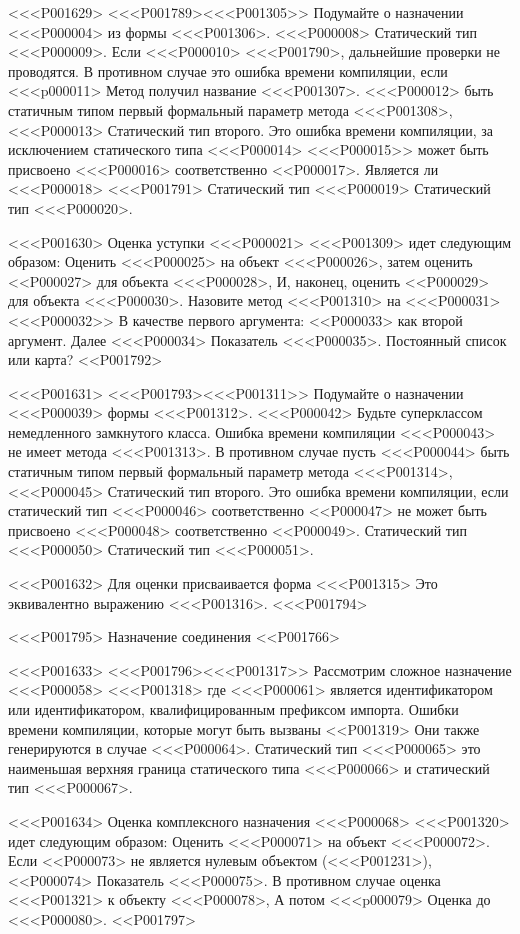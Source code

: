 <<<P001629>%
<<<P001789><<<P001305>>
Подумайте о назначении <<<P000004> из формы <<<P001306>.
<<<P000008> Статический тип <<<P000009>.
Если <<<P000010> <<<P001790>, дальнейшие проверки не проводятся.
В противном случае это ошибка времени компиляции, если
<<<p000011> Метод получил название <<<P001307>.
<<<P000012> быть статичным типом
первый формальный параметр метода <<<P001308>,
<<<P000013> Статический тип второго.
Это ошибка времени компиляции, за исключением статического типа <<<P000014> <<<P000015>>
может быть присвоено <<<P000016> соответственно <<P000017>.
Является ли <<<P000018> <<<P001791>
Статический тип <<<P000019> Статический тип <<<P000020>.

<<<P001630>%
Оценка уступки <<<P000021> <<<P001309>
идет следующим образом:
Оценить <<<P000025> на объект <<<P000026>,
затем оценить <<P000027> для объекта <<<P000028>,
И, наконец, оценить <<P000029> для объекта <<<P000030>.
Назовите метод <<<P001310> на <<<P000031>
<<<P000032>> В качестве первого аргумента: <<P000033> как второй аргумент.
Далее <<<P000034> Показатель <<<P000035>.
Постоянный список или карта?
<<P001792>

<<<P001631>%
<<<P001793><<<P001311>>
Подумайте о назначении <<<P000039> формы <<<P001312>.
<<<P000042> Будьте суперклассом немедленного замкнутого класса.
Ошибка времени компиляции <<<P000043> не имеет метода <<<P001313>.
В противном случае пусть <<<P000044> быть статичным типом
первый формальный параметр метода <<<P001314>,
<<<P000045> Статический тип второго.
Это ошибка времени компиляции, если статический тип <<<P000046> соответственно <<P000047>
не может быть присвоено <<<P000048> соответственно <<P000049>.
Статический тип <<<P000050> Статический тип <<<P000051>.

<<<P001632>%
Для оценки присваивается форма <<<P001315>
Это эквивалентно выражению <<<P001316>.
<<<P001794>


<<<P001795> Назначение соединения
<<P001766>

<<<P001633>%
<<<P001796><<<P001317>>
Рассмотрим сложное назначение <<<P000058> <<<P001318>
где <<<P000061> является идентификатором или идентификатором, квалифицированным префиксом импорта.
Ошибки времени компиляции, которые могут быть вызваны
<<P001319>
Они также генерируются в случае <<<P000064>.
Статический тип <<<P000065> это
наименьшая верхняя граница статического типа <<<P000066> и статический тип <<<P000067>.

<<<P001634>%
Оценка комплексного назначения <<<P000068> <<<P001320>
идет следующим образом:
Оценить <<<P000071> на объект <<<P000072>.
Если <<P000073> не является нулевым объектом (<<<P001231>), <<P000074> Показатель <<<P000075>.
В противном случае оценка <<<P001321> к объекту <<<P000078>,
А потом <<<p000079> Оценка до <<<P000080>.
<<P001797>

